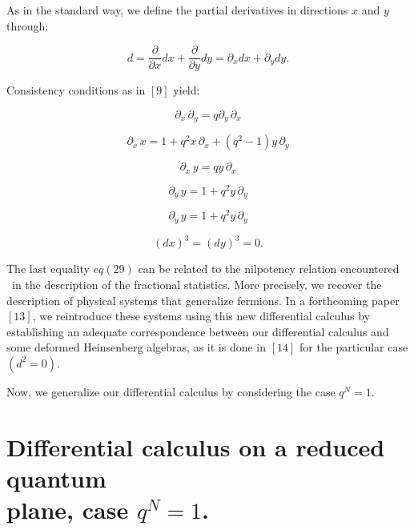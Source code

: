 \documentclass[a4paper,12pt,thmsa]{article}
\begin{document}
As in the standard way, we define the partial derivatives in directions $x$
and $y$ through:

\begin{equation}
d=\frac \partial {\partial x}dx+\frac \partial {\partial y}dy=\partial
_xdx+\partial _ydy.
\end{equation}

Consistency conditions as in $[9]$ yield:

\begin{equation}
\partial _{x}\, \partial _{y}=q\partial _{y}\, \partial _{x}
\end{equation}

\begin{equation}
\partial _{x}\, x=1+q^{2}x\, \partial _{x}+(q^{2}-1)y\, %
\partial _{y}
\end{equation}

\begin{equation}
\partial _{x}\, y=qy\, \partial _{x}
\end{equation}

\begin{equation}
\partial _{y}\, y=1+q^{2}y\, \partial _{y}
\end{equation}

\begin{equation}
\partial _{y}\, y=1+q^{2}y\, \partial _{y}
\end{equation}

\begin{equation}
(dx)^{3}=(dy)^{3}=0.
\end{equation}

The last equality $eq(29)$ can be related to the nilpotency relation
encountered \ in the description of the fractional statistics. More
precisely, we recover the description of physical systems that generalize
fermions. In a forthcoming paper $\left[ 13\right] $, we reintroduce these
systems using this new differential calculus by establishing an adequate
correspondence between our differential calculus and some deformed
Heinsenberg algebras, as it is done in $\left[ 14\right] $ for the
particular case $(d^2=0)$.

Now, we generalize our differential calculus by considering the case $q^N=1$.

\section{Differential calculus on a reduced quantum\protect\\plane, case $%
q^N=1$.}
\end{document}
